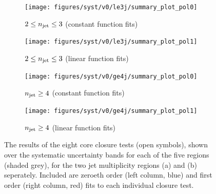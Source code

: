 \begin{figure}[ht!]
  \centering
  \begin{subfigure}[b]{0.46\textwidth}
    \texttt{[image: figures/syst/v0/le3j/summary\_plot\_pol0]}
    \caption{$2 \leq n_{\text{jet}} \leq 3$ (constant function fits)}
    \label{fig:closure_fit_le3j_pol0}
  \end{subfigure}
  \begin{subfigure}[b]{0.46\textwidth}
    \texttt{[image: figures/syst/v0/le3j/summary\_plot\_pol1]}
    \caption{$2 \leq n_{\text{jet}} \leq 3$ (linear function fits)}
    \label{fig:closure_fit_le3j_pol1}
  \end{subfigure}
  \begin{subfigure}[b]{0.46\textwidth}
    \texttt{[image: figures/syst/v0/ge4j/summary\_plot\_pol0]}
    \caption{$n_{\text{jet}} \geq 4$ (constant function fits)}
    \label{fig:closure_fit_ge4j_pol0}
  \end{subfigure}
  \begin{subfigure}[b]{0.46\textwidth}
    \texttt{[image: figures/syst/v0/ge4j/summary\_plot\_pol1]}
    \caption{$n_{\text{jet}} \geq 4$ (linear function fits)}
    \label{fig:closure_fit_ge4j_pol1}
  \end{subfigure}
  \caption{The results of the eight core closure tests (open symbols), shown 
  over the systematic uncertainty bands for each of the five \HT regions
  (shaded grey), for the two jet multiplicity regions (a) \njlow and (b) \njhigh 
  seperately. Included are zeroeth order (left column, blue) and first order (right 
  column, red) fits to each individual closure test.}
  \label{fig:closure_fits}
\end{figure}

